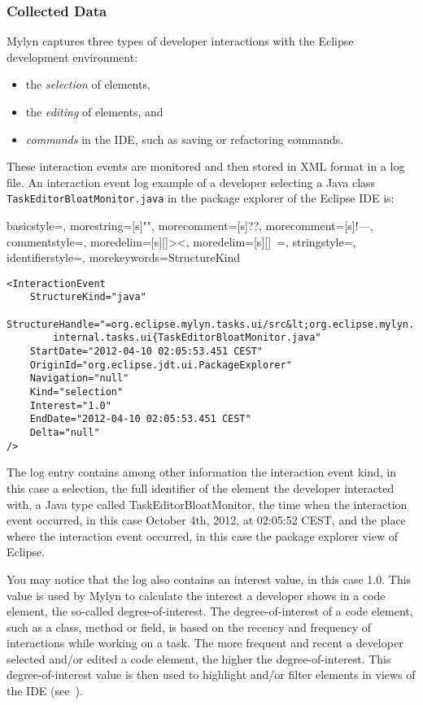 \subsubsection{Collected Data}
Mylyn captures three types of developer interactions with the Eclipse development environment:
\begin{itemize}
    \item the \textit{selection} of elements,
    \item the \textit{editing} of elements, and
    \item \textit{commands} in the IDE, such as saving or refactoring commands.
\end{itemize}

These interaction events are monitored and then stored in XML format in a log file. An interaction event log example of a developer selecting a Java class \texttt{TaskEditorBloatMonitor.java} in the package explorer of the Eclipse IDE is:

{
  basicstyle=\ttfamily,
  morestring=[s]{"}{"},
  morecomment=[s]{?}{?},
  morecomment=[s]{!--}{--},
  commentstyle=\color{darkgreen},
  moredelim=[s][\color{darkblue}]{>}{<},
  moredelim=[s][\color{red}]{\ }{=},
  stringstyle=\color{blue},
  identifierstyle=\color{maroon},
  morekeywords={StructureKind}
}




\begin{lstlisting}
<InteractionEvent 
    StructureKind="java"
    StructureHandle="=org.eclipse.mylyn.tasks.ui/src&lt;org.eclipse.mylyn.
        internal.tasks.ui{TaskEditorBloatMonitor.java" 
    StartDate="2012-04-10 02:05:53.451 CEST"
    OriginId="org.eclipse.jdt.ui.PackageExplorer" 
    Navigation="null" 
    Kind="selection" 
    Interest="1.0" 
    EndDate="2012-04-10 02:05:53.451 CEST" 
    Delta="null"
/>
\end{lstlisting}

The log entry contains among other information the interaction event kind, in this case a selection, the full identifier of the element the developer interacted with, a Java type called TaskEditorBloatMonitor, the time when the interaction event occurred, in this case October 4th, 2012, at 02:05:52 CEST, and the place where the interaction event occurred, in this case the package explorer view of Eclipse. 

You may notice that the log also contains an interest value, in this case 1.0. This value is used by Mylyn to calculate the interest a developer shows in a code element, the so-called degree-of-interest. The degree-of-interest of a code element, such as a class, method or field, is based on the recency and frequency of interactions while working on a task. The more frequent and recent a developer selected and/or edited a code element, the higher the degree-of-interest. This degree-of-interest value is then used to highlight and/or filter elements in views of the IDE (see~\cite{kersten2007focusing,Kersten-Mylin}).

